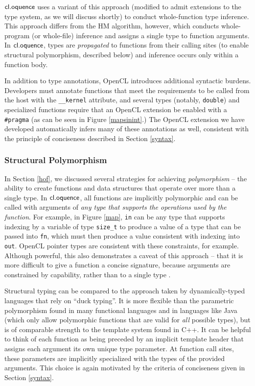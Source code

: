 \documentclass{llncs}
\begin{document}
$\textsf{cl.oquence}$ uses a variant of this approach (modified to admit extensions to the type system, as we will discuss shortly) to conduct whole-function type inference. This approach differs from the HM algorithm, however, which conducts whole-program (or whole-file) inference and assigns a single type to function arguments. In $\textsf{cl.oquence}$, types are {\it propagated} to functions from their calling sites (to enable structural polymorphism, described below) and inference occurs only within a function body.

In addition to type annotations, OpenCL introduces additional syntactic burdens. Developers must annotate functions that meet the requirements to be called from the host with the \verb|__kernel| attribute, and several types (notably, \verb|double|) and specialized functions require that an OpenCL extension be enabled with a \verb|#pragma| (as  can be seen in Figure \ref{mapsinint}.) The OpenCL extension we have developed automatically infers many of these annotations as well, consistent with the principle of conciseness described in Section \ref{syntax}.

\subsubsection{Structural Polymorphism}
In Section \ref{hof}, we discussed several strategies for achieving {\it polymorphism} -- the ability to create functions and data structures that operate over more than a single type. In $\textsf{cl.oquence}$, all functions are implicitly polymorphic and can be called with arguments of {\it any type that supports the operations used by the function}. For example, in Figure \ref{map}, \verb|in| can be any type that supports indexing by a variable of type \verb|size_t| to produce a value of a type that can be passed into \verb|fn|, which must then produce a value consistent with indexing into \verb|out|. OpenCL pointer types are consistent with these constraints, for example. Although powerful, this also demonstrates a caveat of this approach -- that it is more difficult to give a function a concise signature, because arguments are constrained by capability, rather than to a single type \cite{malayeri2009structural}.

Structural typing can be compared to the approach taken by dynamically-typed languages that rely on ``duck typing''. It is more flexible than the parametric polymorphism found in many functional languages and in languages like Java (which only allow polymorphic functions that are valid for {\it all} possible types), but is of comparable strength to the template system found in C++. It can be helpful to think of each function as being preceded by an implicit template header that assigns each argument its own unique type parameter. At function call sites, these parameters are implicitly specialized with the types of the provided arguments. This choice is again motivated by the criteria of conciseness given in Section \ref{syntax}.
\end{document}
